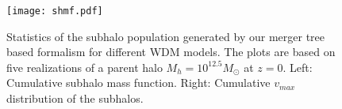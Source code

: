 \documentclass[a4paper,11pt]{article}
\begin{document}
\begin{figure}
  \centering
  \texttt{[image: shmf.pdf]}
  \caption{Statistics of the subhalo population generated by our merger tree based formalism for different WDM models. The plots are based on five realizations of a parent halo $M_h = 10^{12.5}M_{\odot}$ at $z=0$. Left: Cumulative subhalo mass function. Right: Cumulative $v_{max}$ distribution of the subhalos.}
  \label{fig:shmf}
\end{figure}
\end{document}
